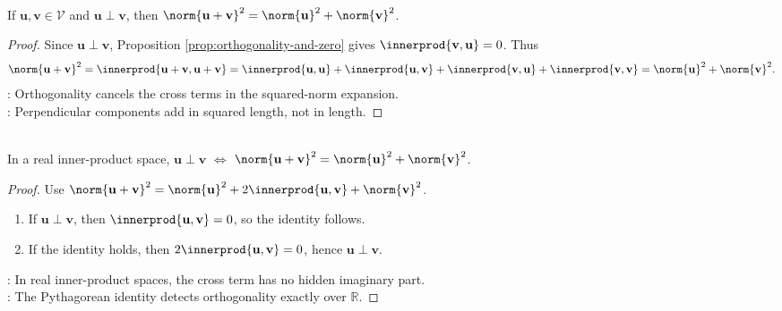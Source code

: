 \begin{theorem} \label{thm:pythagorean-inner-product} \\
If $\mathbf{u},\mathbf{v}\in\mathcal{V}$ and $\mathbf{u}\perp\mathbf{v}$, then $\norm{\mathbf{u}+\mathbf{v}}^2=\norm{\mathbf{u}}^2+\norm{\mathbf{v}}^2$.
\begin{proof}
Since $\mathbf{u}\perp\mathbf{v}$, Proposition \ref{prop:orthogonality-and-zero} gives $\innerprod{\mathbf{v},\mathbf{u}}=0$. Thus
\begin{align}
\norm{\mathbf{u}+\mathbf{v}}^2 =\innerprod{\mathbf{u}+\mathbf{v},\mathbf{u}+\mathbf{v}}=\innerprod{\mathbf{u},\mathbf{u}}+\innerprod{\mathbf{u},\mathbf{v}}
  +\innerprod{\mathbf{v},\mathbf{u}}+\innerprod{\mathbf{v},\mathbf{v}} =\norm{\mathbf{u}}^2+\norm{\mathbf{v}}^2.
\nonumber
\end{align}
: Orthogonality cancels the cross terms in the squared-norm expansion.\\
: Perpendicular components add in squared length, not in length.
\end{proof}
\end{theorem}

\begin{proposition} \label{prop:pythagorean-converse-real-inner-products} \\
In a real inner-product space, $\mathbf{u}\perp\mathbf{v}$ $\Longleftrightarrow$ $\norm{\mathbf{u}+\mathbf{v}}^2=\norm{\mathbf{u}}^2+\norm{\mathbf{v}}^2$.
\begin{proof}
Use $\norm{\mathbf{u}+\mathbf{v}}^2 =\norm{\mathbf{u}}^2+2\innerprod{\mathbf{u},\mathbf{v}}+\norm{\mathbf{v}}^2$.
\begin{enumerate}[label=\roman*.]
\setlength{\itemsep}{0pt}
\item[$(\Rightarrow)$] If $\mathbf{u}\perp\mathbf{v}$, then $\innerprod{\mathbf{u},\mathbf{v}}=0$, so the identity follows.
\item[$(\Leftarrow)$] If the identity holds, then $2\innerprod{\mathbf{u},\mathbf{v}}=0$, hence $\mathbf{u}\perp\mathbf{v}$.
\end{enumerate}
: In real inner-product spaces, the cross term has no hidden imaginary part.\\
: The Pythagorean identity detects orthogonality exactly over $\mathbb{R}$.
\end{proof}
\end{proposition}

